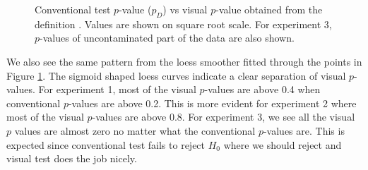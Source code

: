 \documentclass{article}
\newcommand{\hh}[1]{{\color{orange} #1}} %
\begin{document}
\begin{figure}[hbtp]
   \centering
       \caption{Conventional test $p$-value ($p_D$) vs visual $p$-value obtained from the definition . Values are shown on square root scale. For experiment 3, $p$-values of uncontaminated part of the data are also shown.}
       \label{fig:pval_definition}
\end{figure}

We also see the same pattern from the loess smoother fitted through the points in Figure \ref{fig:pval_definition}. The sigmoid shaped loess curves indicate a clear separation of visual $p$-values. For experiment 1, most of the visual $p$-values are above 0.4 when conventional $p$-values are above 0.2. This is more evident for experiment 2 where most of the visual $p$-values are above 0.8. For experiment 3, we see all the visual $p$ values are almost zero no matter what the conventional $p$-values are. This is expected since conventional test fails to reject $H_0$ where we should reject and visual test does the job nicely.

\end{document}
